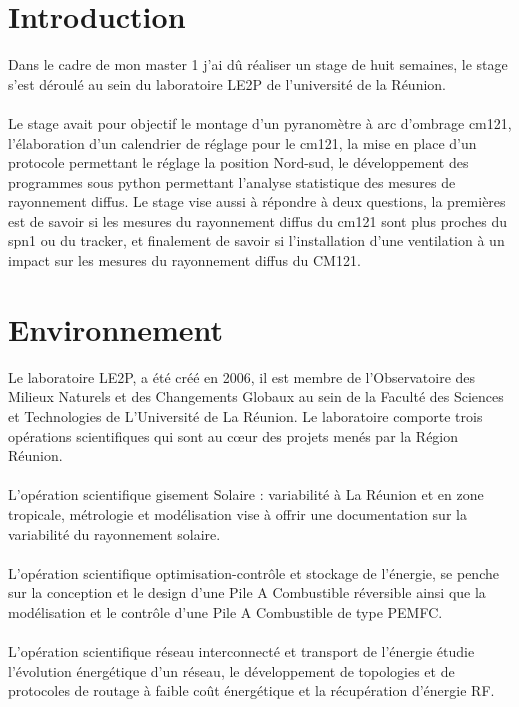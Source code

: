\documentclass[12pt,a4paper]{article}
\begin{document}
\begin{flushleft}


\sf
\section*{Introduction}
%
\setcounter{page}{3}

Dans le cadre de mon master 1 j'ai dû réaliser un stage de huit semaines, le stage s'est déroulé au sein du laboratoire LE2P de l'université de la Réunion.\\
~\\
Le stage avait pour objectif le montage d'un pyranomètre à arc d'ombrage cm121, l'élaboration d'un calendrier de réglage pour le cm121, la mise en place d'un protocole permettant le réglage la position Nord-sud, le développement des programmes sous python permettant l'analyse statistique des mesures de rayonnement diffus. Le stage vise aussi à répondre à deux questions, la premières est de savoir si les mesures du rayonnement diffus du cm121 sont plus proches  du spn1 ou du tracker, et finalement de savoir si l'installation d'une ventilation à un impact sur les mesures du rayonnement diffus du CM121.
 

\section{Environnement}



Le laboratoire LE2P, a été créé en 2006,  il est membre de l’Observatoire des Milieux Naturels et des Changements Globaux au sein de la Faculté des Sciences et Technologies de L’Université de La Réunion. Le laboratoire comporte trois opérations scientifiques qui sont au cœur des projets menés par la Région Réunion.\\
~\\
L'opération scientifique gisement Solaire : variabilité à La Réunion et en zone tropicale, métrologie et modélisation  vise à offrir une documentation sur la variabilité du rayonnement solaire.\\
~\\
L'opération scientifique optimisation-contrôle et stockage de l'énergie, se penche sur la conception et le design d’une Pile A Combustible réversible ainsi que la modélisation et le contrôle d’une Pile A Combustible de type PEMFC.\\ 
~\\
L'opération scientifique réseau interconnecté et transport de l'énergie étudie l’évolution énergétique d'un réseau, le développement de topologies et de protocoles de routage à faible coût énergétique et la récupération d’énergie RF.
~\\



\end{flushleft}
\end{document}
